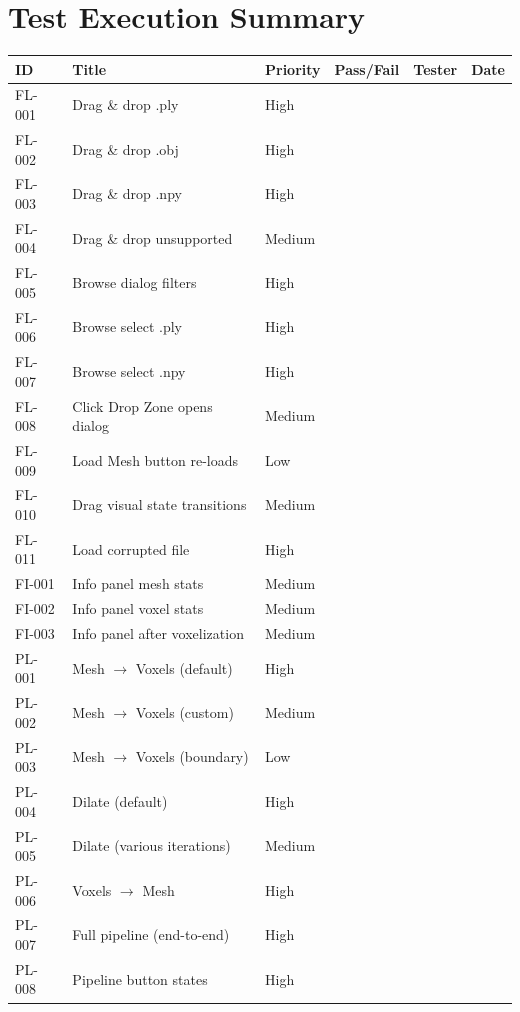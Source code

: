 \documentclass[12pt,a4paper]{article}
\begin{document}
\section{Test Execution Summary}

\begin{longtable}{p{1.2cm}p{5.5cm}p{1.5cm}p{1.5cm}p{1.5cm}p{2cm}}
\toprule
\textbf{ID} & \textbf{Title} & \textbf{Priority} & \textbf{Pass/Fail} & \textbf{Tester} & \textbf{Date} \\
\midrule
FL-001 & Drag \& drop .ply & High & & & \\
FL-002 & Drag \& drop .obj & High & & & \\
FL-003 & Drag \& drop .npy & High & & & \\
FL-004 & Drag \& drop unsupported & Medium & & & \\
FL-005 & Browse dialog filters & High & & & \\
FL-006 & Browse select .ply & High & & & \\
FL-007 & Browse select .npy & High & & & \\
FL-008 & Click Drop Zone opens dialog & Medium & & & \\
FL-009 & Load Mesh button re-loads & Low & & & \\
FL-010 & Drag visual state transitions & Medium & & & \\
FL-011 & Load corrupted file & High & & & \\
\addlinespace
FI-001 & Info panel mesh stats & Medium & & & \\
FI-002 & Info panel voxel stats & Medium & & & \\
FI-003 & Info panel after voxelization & Medium & & & \\
\addlinespace
PL-001 & Mesh $\rightarrow$ Voxels (default) & High & & & \\
PL-002 & Mesh $\rightarrow$ Voxels (custom) & Medium & & & \\
PL-003 & Mesh $\rightarrow$ Voxels (boundary) & Low & & & \\
PL-004 & Dilate (default) & High & & & \\
PL-005 & Dilate (various iterations) & Medium & & & \\
PL-006 & Voxels $\rightarrow$ Mesh & High & & & \\
PL-007 & Full pipeline (end-to-end) & High & & & \\
PL-008 & Pipeline button states & High & & & \\

\end{longtable}
\end{document}
